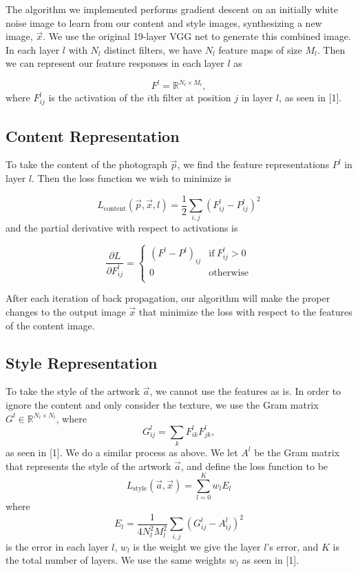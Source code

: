 \documentclass[10pt,twocolumn,letterpaper]{article}
\begin{document}
The algorithm we implemented performs gradient descent on an initially white noise image to learn from our content and style images, synthesizing a new image, $\vec{x}$. We use the original 19-layer VGG net to generate this combined image. In each layer $l$ with $N_l$ distinct filters, we have $N_l$ feature maps of size $M_l$. Then we can represent our feature responses in each layer $l$ as

\[ F^l = \mathbb{R}^{N_l \times M_l} , \]
where $F_{ij}^l$ is the activation of the $i$th filter at position $j$ in layer $l$, as seen in [1].
\newline

\subsection{Content Representation}

To take the content of the photograph $\vec{p}$, we find the feature representations $P^l$ in layer $l$. Then the loss function we wish to minimize is

 \[ L_{\text{content}} ( \vec{p}, \vec{x}, l ) = \frac{1}{2} \sum_{i,j} (F_{ij}^l - P_{ij}^l)^2 \]
and the partial derivative with respect to activations is

\[ \frac{ \partial L}{\partial F_{ij}^l} = \left\{
    \begin{array}{ll}
          (F^l - P^l)_{ij} &\text{if} \ F_{ij}^l > 0 \\
         0 & \text{otherwise} \\
    \end{array} 
\right. \]

After each iteration of back propagation, our algorithm will make the proper changes to the output image $\vec{x}$ that minimize the loss with respect to the features of the content image.

\subsection{Style Representation}

To take the style of the artwork $\vec{a}$, we cannot use the features as is. In order to ignore the content and only consider the texture, we use the Gram matrix $G^l \in \mathbb{R}^{N_l \times N_l}$, where
\[ G_{ij}^l = \sum_k F_{ik}^l F_{jk}^l , \]
as seen in [1]. We do a similar process as above. We let $A^l$ be the Gram matrix that represents the style of the artwork $\vec{a}$, and define the loss function to be
\[ L_{\text{style}}(\vec{a}, \vec{x}) = \sum_{l = 0}^{K} w_l E_l \]
where
\[ E_l = \frac{1}{4N_l^2 M_l^2} \sum_{i,j} (G_{ij}^l - A_{ij}^l)^2 \]
is the error in each layer $l$, $w_l$ is the weight we give the layer $l$'s error, and $K$ is the total number of layers. We use the same weights $w_l$ as seen in [1].
\end{document}
